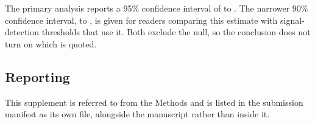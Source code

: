 \documentclass{article}
\begin{document}
The primary analysis reports a 95\% confidence interval of  to
. The narrower 90\% confidence interval,  to
, is given for readers comparing this estimate with signal-detection
thresholds that use it. Both exclude the null, so the conclusion does not turn on which is
quoted.


\subsection{Reporting}

This supplement is referred to from the Methods and is listed in the submission manifest as
its own file, alongside the manuscript rather than inside it.


\end{document}
